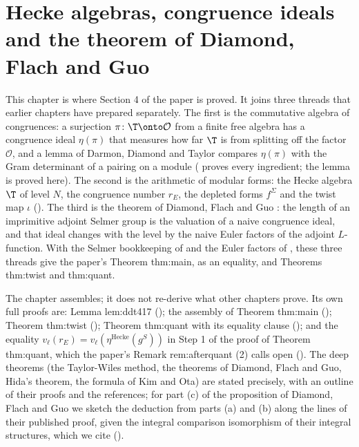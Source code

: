 \chapter{Hecke algebras, congruence ideals and the theorem of Diamond, Flach and Guo}\label{ch:congruence}

This chapter is where Section 4 of the paper is proved. It joins three threads that earlier chapters have prepared separately. The first is
the commutative algebra of congruences: a surjection $\pi\colon\T\onto\mathcal O$ from a finite free algebra has a congruence ideal $\eta(\pi)$ that measures how
far $\T$ is from splitting off the factor $\mathcal O$, and a lemma of Darmon, Diamond and Taylor compares $\eta(\pi)$ with the Gram determinant of a pairing on a
module ( proves every ingredient; the lemma is proved here). The second is the arithmetic of modular forms: the Hecke algebra $\T$ of
level $N$, the congruence number $r_E$, the depleted forms $f^\Sigma$ and the twist map $\iota$ (). The third is the
theorem of Diamond, Flach and Guo \cite{DFG04}: the length of an imprimitive adjoint Selmer group is the valuation of a naive congruence ideal, and that
ideal changes with the level by the naive Euler factors of the adjoint $L$-function. With the Selmer bookkeeping of  and the Euler
factors of , these three threads give the paper's Theorem thm:main, as an equality, and Theorems thm:twist and thm:quant.

The chapter assembles; it does not re-derive what other chapters prove. Its own full proofs are: Lemma lem:ddt417 (); the assembly of Theorem thm:main
(); Theorem thm:twist (); Theorem thm:quant with its equality clause (); and
the equality $v_\ell(r_E)=v_\ell(\eta^{\mathrm{Hecke}}(g^S))$ in Step 1 of the proof of Theorem thm:quant, which the paper's Remark rem:afterquant (2) calls open
(). The deep theorems (the Taylor-Wiles method, the theorems of Diamond, Flach and Guo, Hida's theorem, the formula of
Kim and Ota) are stated precisely, with an outline of their proofs and the references; for part (c) of the proposition of Diamond, Flach and Guo we sketch the
deduction from parts (a) and (b) along the lines of their published proof, given the integral comparison isomorphism of their integral structures, which we cite ().

